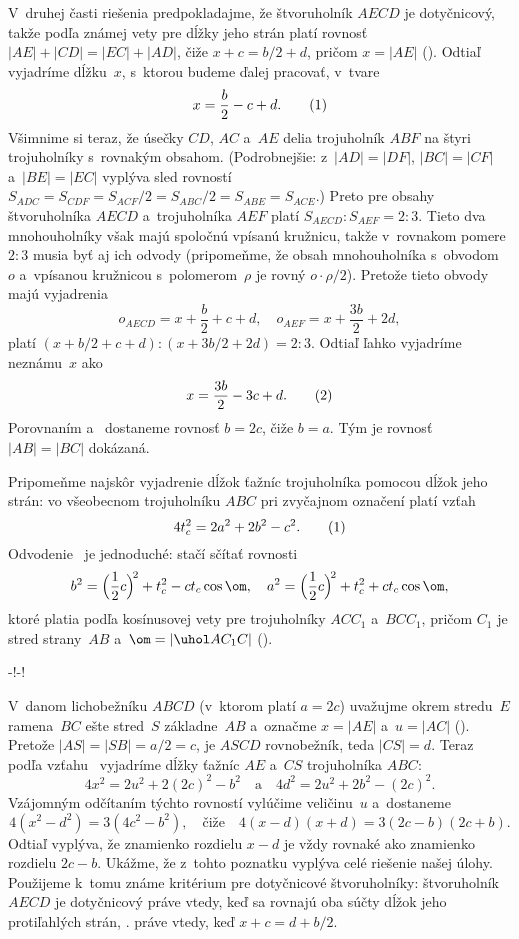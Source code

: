 {V~druhej časti riešenia predpokladajme, že štvoruholník $AECD$ je
dotyčnicový, takže podľa známej vety pre dĺžky jeho strán platí
rovnosť $|AE|+|CD|=|EC|+|AD|$, čiže $x+c=b/2+d$, pričom $x=|AE|$
(\obr). Odtiaľ vyjadríme dĺžku~$x$, s~ktorou budeme ďalej
pracovať, v~tvare
$$
x=\frac{b}{2}-c+d.
\tag1
$$
Všimnime si teraz, že úsečky $CD$, $AC$ a~$AE$ delia
trojuholník $ABF$ na štyri trojuholníky s~rovnakým obsahom. (Podrobnejšie:
z~$|AD|=|DF|$, $|BC|=|CF|$ a~$|BE|=|EC|$ vyplýva sled rovností
$S_{ADC}=S_{CDF}=S_{ACF}/2=S_{ABC}/2=S_{ABE}=S_{ACE}$.)
Preto pre obsahy štvoruholníka $AECD$ a~trojuholníka $AEF$ platí
$S_{AECD}:S_{AEF}=2:3$. Tieto dva mnohouholníky však majú
spoločnú vpísanú kružnicu, takže v~rovnakom pomere $2:3$ musia
byť aj ich odvody (pripomeňme, že obsah mnohouholníka
s~obvodom~$o$ a~vpísanou kružnicou s~polomerom~$\rho$ je rovný
$o\cdot\rho/2$). Pretože tieto obvody majú vyjadrenia
$$
o_{AECD}=x+\frac{b}{2}+c+d,\quad
o_{AEF}=x+\frac{3b}{2}+2d,
$$
platí $(x+b/2+c+d):(x+3b/2+2d)=2:3$. Odtiaľ ľahko
vyjadríme neznámu~$x$ ako
$$
x=\frac{3b}{2}-3c+d.                 \tag2
$$
Porovnaním  a~ dostaneme rovnosť $b=2c$, čiže $b=a$. Tým
je rovnosť $|AB|=|BC|$ dokázaná.

\ineriesenie
{} %
Pripomeňme najskôr vyjadrenie dĺžok ťažníc
trojuholníka pomocou dĺžok jeho strán: vo všeobecnom trojuholníku $ABC$ pri zvyčajnom
označení platí vzťah
$$
4t_c^2=2a^2+2b^2-c^2.
\tag1
$$
Odvodenie~ je jednoduché: stačí sčítať rovnosti
$$
b^2=\Bigl(\frac12c\Bigr)^{\!2}+t_c^2-ct_c\cos\om,\quad
a^2=\Bigl(\frac12c\Bigr)^{\!2}+t_c^2+ct_c\cos\om,
$$
ktoré platia podľa kosínusovej vety pre trojuholníky $ACC_1$ a~$BCC_1$, pričom
$C_1$ je stred strany~$AB$ a~$\om=|\uhol AC_1C|$ (\obr).

\midinsert
\centerline{\inspicture-!\hss\inspicture-!}
\endinsert


V~danom lichobežníku $ABCD$ (v~ktorom platí $a=2c$) uvažujme
okrem stredu~$E$ ramena~$BC$  ešte stred~$S$ základne~$AB$ 
a~označme $x=|AE|$ a~$u=|AC|$ (\obr). Pretože  $|AS|=|SB|=a/2=c$,
je $ASCD$ rovnobežník, teda $|CS|=d$. Teraz podľa vzťahu~
vyjadríme dĺžky ťažníc $AE$ a~$CS$ trojuholníka $ABC$:
$$
4x^2=2u^2+2(2c)^2-b^2\quad\text{a}\quad
4d^2=2u^2+2b^2-(2c)^2.
$$
Vzájomným odčítaním týchto rovností vylúčime veličinu~$u$ 
a~dostaneme
$$
4(x^2-d^2)=3(4c^2-b^2),\quad\text{čiže}\quad
4(x-d)(x+d)=3(2c-b)(2c+b).
$$
Odtiaľ vyplýva, že znamienko rozdielu $x-d$ je vždy rovnaké ako
znamienko rozdielu $2c-b$. Ukážme, že z~tohto poznatku vyplýva celé
riešenie našej úlohy. Použijeme k~tomu známe kritérium pre dotyčnicové
štvoruholníky: štvoruholník $AECD$ je dotyčnicový práve vtedy, keď sa
rovnajú oba súčty dĺžok jeho protiľahlých strán, \tj. práve vtedy, keď
$x+c=d+b/2$.

}

